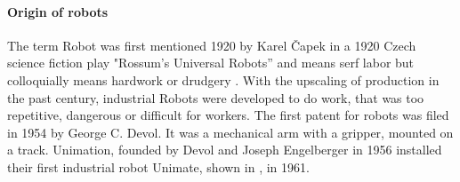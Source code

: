 \paragraph{Origin of robots}
The term \gls{Robot} was first mentioned 1920 by Karel \v{C}apek in a  1920 Czech science ﬁction play "Rossum’s Universal Robots” and means serf labor but colloquially means hardwork or drudgery \cite{CorkeRoboticVisionControl}. With the upscaling of production in the past century, industrial \glspl{Robot} were developed to do work, that was too repetitive, dangerous or difficult for workers. The first patent for robots was filed in 1954 by George C. Devol. It was a mechanical arm with a gripper, mounted on a track. %
Unimation, founded by Devol and Joseph Engelberger in 1956 installed their first industrial robot Unimate, shown in , in 1961.



